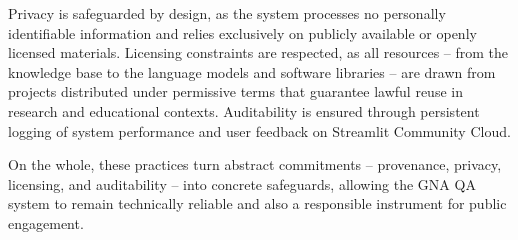 \begin{spacing}{1.5}
Privacy is safeguarded by design, as the system processes no personally identifiable information and relies exclusively on publicly available or openly licensed materials. Licensing constraints are respected, as all resources -- from the knowledge base to the language models and software libraries -- are drawn from projects distributed under permissive terms that guarantee lawful reuse in research and educational contexts. Auditability is ensured through persistent logging of system performance and user feedback on Streamlit Community Cloud.

On the whole, these practices turn abstract commitments -- provenance, privacy, licensing, and auditability -- into concrete safeguards, allowing the GNA QA system to remain technically reliable and also a responsible instrument for public engagement.

\end{spacing}
